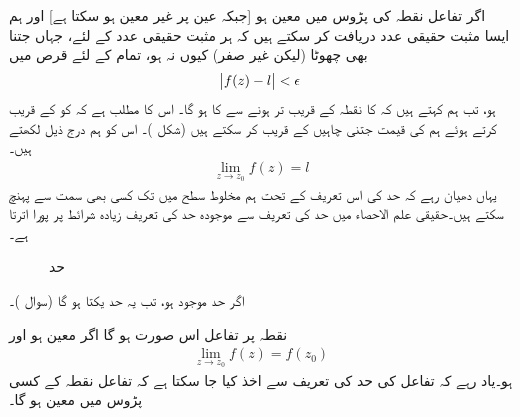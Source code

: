 اگر تفاعل  نقطہ  کی پڑوس میں معین ہو [جبکہ عین  پر  غیر معین ہو سکتا ہے] اور ہم ایسا مثبت حقیقی عدد  دریافت کر سکتے ہیں کہ ہر مثبت حقیقی  عدد  کے لئے، جہاں  جتنا بھی چھوٹا (لیکن غیر صفر) کیوں نہ ہو، تمام  کے لئے قرص  میں 
 \begin{align}\label{مساوات_مخلوط_حد_تعریف_الف}
\abs{f(z)-l}<\epsilon
\end{align}
ہو، تب ہم کہتے ہیں کہ  کا  نقطہ  کے قریب تر ہونے سے  کا   ہو گا۔ اس کا مطلب ہے کہ  کو  کے  قریب کرتے ہوئے ہم   کی قیمت  جتنی چاہیں   کے قریب کر سکتے ہیں (شکل )۔ اس کو ہم درج ذیل لکھتے ہیں۔
\begin{align}\label{مساوات_مخلوط_حد_تعریف_ب}
\lim_{z\to z_0} f(z)=l
\end{align}
یہاں دھیان رہے کہ حد کی اس تعریف کے تحت ہم مخلوط سطح میں  تک کسی بھی سمت سے پہنچ سکتے ہیں۔حقیقی علم الاحصاء میں حد کی تعریف سے موجودہ حد کی تعریف زیادہ شرائط پر پورا اترتا  ہے۔
%
\begin{figure}
\centering
{}
\caption{حد}
\label{شکل_مخلوط_حد_تعریف}
\end{figure}

اگر حد موجود ہو، تب یہ حد یکتا ہو گا (سوال )۔

نقطہ  پر تفاعل  اس صورت  ہو گا اگر  معین ہو اور
\begin{align}
\lim_{z\to z_0}f(z)=f(z_0)
\end{align}
ہو۔یاد رہے کہ تفاعل کی حد کی تعریف سے اخذ کیا جا سکتا ہے کہ تفاعل  نقطہ  کے کسی  پڑوس میں معین ہو گا۔

